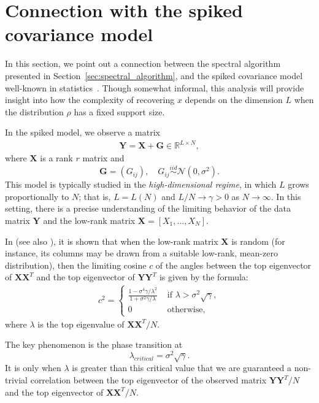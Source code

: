 \documentclass{IEEEtran}
\numberwithin{equation}{section}
\numberwithin{figure}{section}
\theoremstyle{plain}
\theoremstyle{definition}
\theoremstyle{remark}
\theoremstyle{plain}
\theoremstyle{remark}
\theoremstyle{plain}
\theoremstyle{plain}
\theoremstyle{remark}
\newcommand{\Y}{\mathbf{Y}}
\newcommand{\X}{\mathbf{X}}
\begin{document}
\section{Connection with the spiked covariance model } \label{sec:spike_model}

In this section, we point out a connection between the spectral algorithm presented in Section~\ref{sec:spectral_algorithm}, and the spiked covariance model well-known in statistics~\cite{johnstone2001distribution, paul2007asymptotics, gavish-donoho-2017, benaych2012singular,dobriban2017optimal}. Though somewhat informal, this analysis will provide insight into how the complexity of recovering $x$ depends on the dimension $L$ when the distribution $\rho$ has a fixed support size.

In the spiked model, we observe a matrix
%
\begin{align}
%
    \Y = \X + \mathbf G \in \mathbb{R}^{L \times N},
%
\end{align}
%
where $\X$ is a rank $r$ matrix and 
\[  \mathbf G=(G_{ij}) , \quad   G_{ij} \overset{iid}{\sim} \mathcal{N}(0,\sigma^2). \] 
This model is typically studied in the \textit{high-dimensional regime}, in which $L$ grows proportionally to $N$; that is, $L = L(N)$ and $L / N \to \gamma > 0$ as $N \to \infty$. In this setting, there is a precise understanding of the limiting behavior of the data matrix $\Y$ and the low-rank matrix $\X = [X_1,\dots,X_N]$.

In \cite{benaych2012singular} (see also \cite{paul2007asymptotics}), it is shown that when the low-rank matrix $\X$ is random (for instance, its columns may be drawn from a suitable low-rank, mean-zero distribution), then the limiting cosine $c$ of the angles between the top eigenvector of $\X \X^T$ and the top eigenvector of $\Y \Y^T$ is given by the formula:
%
\begin{align}
\label{cos_limit}
%
c^2 = 
\begin{cases}
%
\frac{1 - \sigma^4 \gamma/\lambda^2}{1 + \sigma^2 \gamma/ \lambda}
& \text{ if } \lambda > \sigma^2 \sqrt{\gamma}, \\
0 
& \text{ otherwise,}
\end{cases}
\end{align}
%
where $\lambda$ is the top eigenvalue of $\X\X^T / N$.

The key phenomenon is the phase transition at 
%
\begin{equation} \label{eq:phase_transition}
%
    \lambda_{critical} = \sigma^2 \sqrt{\gamma}.
%
\end{equation}
It is only when $\lambda$ is greater than this critical value that we are guaranteed a non-trivial correlation between the top eigenvector of the observed matrix $\Y\Y^T/N$ and the top eigenvector of $\X\X^T / N$.
\end{document}
